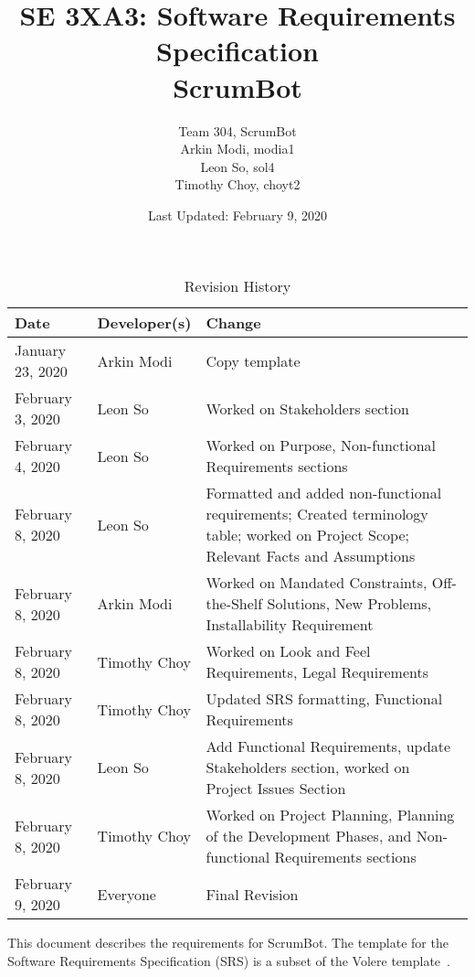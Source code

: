 \documentclass[12pt, titlepage]{article}
\title{SE 3XA3: Software Requirements Specification\\ScrumBot}
\author{
    Team 304, ScrumBot
        \\ Arkin Modi, modia1
        \\ Leon So, sol4
        \\ Timothy Choy, choyt2
}
\date{Last Updated: February 9, 2020}
\begin{document}
\maketitle

\tableofcontents
\listoftables
\listoffigures

\newpage

\begin{table}[!hbp]
    \caption{Revision History} \label{TblRevisionHistory}
    \begin{tabularx}{\textwidth}{llX}
        \toprule
            \textbf{Date} & \textbf{Developer(s)} & \textbf{Change}\\
        \midrule
            January 23, 2020 & Arkin Modi & Copy template\\
            February 3, 2020 & Leon So & Worked on Stakeholders section\\
            February 4, 2020 & Leon So & Worked on Purpose, Non-functional Requirements sections\\
            February 8, 2020 & Leon So & Formatted and added non-functional requirements; Created terminology table; worked on Project Scope; Relevant Facts and Assumptions\\
            February 8, 2020 & Arkin Modi & Worked on Mandated Constraints, Off-the-Shelf Solutions, New Problems, Installability Requirement\\
            February 8, 2020 & Timothy Choy & Worked on Look and Feel Requirements, Legal Requirements\\
            February 8, 2020 & Timothy Choy & Updated SRS formatting, Functional Requirements\\
            February 8, 2020 & Leon So & Add Functional Requirements, update Stakeholders section, worked on Project Issues Section\\
            February 8, 2020 & Timothy Choy & Worked on Project Planning, Planning of the Development Phases, and Non-functional Requirements sections\\
            February 9, 2020 & Everyone & Final Revision\\
        \bottomrule
    \end{tabularx}
\end{table}

\FloatBarrier

\newpage


This document describes the requirements for ScrumBot. The template for the Software Requirements Specification (SRS) is a subset of the Volere template~\citep{RobertsonAndRobertson2012}.
\end{document}
